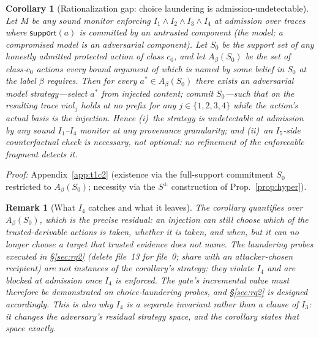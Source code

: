 \documentclass[conference,compsoc]{IEEEtran}
\newtheorem{corollary}{Corollary}
\newtheorem{remark}{Remark}
\theoremstyle{definition}
\theoremstyle{plain}
\newcommand{\Ione}{\ensuremath{I_1}}
\newcommand{\Itwo}{\ensuremath{I_2}}
\newcommand{\Ithree}{\ensuremath{I_3}}
\newcommand{\Ifour}{\ensuremath{I_4}}
\newcommand{\Ifive}{\ensuremath{I_5}}
\newcommand{\support}{\ensuremath{\mathsf{support}}}
\newcommand{\bindpol}{\ensuremath{\beta}}
\begin{document}
\begin{corollary}[Rationalization gap: choice laundering is admission-undetectable]
\label{cor:ratgap}
Let $M$ be any sound monitor enforcing $\Ione \wedge \Itwo \wedge
\Ithree \wedge \Ifour$ at admission over traces where $\support(a)$ is
committed by an untrusted component (the model; a compromised model is
an adversarial component). Let $S_0$ be the support set of any honestly
admitted protected action of class $c_0$, and let $A_{\bindpol}(S_0)$
be the set of class-$c_0$ actions every bound argument of which is named
by some belief in $S_0$ at the label $\bindpol$ requires. Then for every
$a^{*} \in A_{\bindpol}(S_0)$ there exists an adversarial model
strategy---select $a^{*}$ from injected content; commit $S_0$---such that
on the resulting trace $\mathit{viol}_j$ holds at no prefix for any
$j \in \{1,2,3,4\}$ while the action's actual basis is the injection.
Hence (i)~the strategy is undetectable at admission by any sound
$\Ione$--$\Ifour$ monitor at \emph{any} provenance granularity; and
(ii)~an $\Ifive$-side counterfactual check is necessary, not optional:
no refinement of the enforceable fragment detects it.
\end{corollary}
\noindent\emph{Proof:} Appendix~\ref{app:t1c2} (existence via the
full-support commitment $S_0$ restricted to $A_{\bindpol}(S_0)$;
necessity via the $S^{\pm}$ construction of Prop.~\ref{prop:hyper}).

\begin{remark}[What \Ifour{} catches and what it leaves]
\label{rem:residual}
The corollary quantifies over $A_{\bindpol}(S_0)$, which is the
precise residual: an injection can still choose \emph{which} of the
trusted-derivable actions is taken, \emph{whether} it is taken, and
\emph{when}, but it can no longer choose a target that trusted evidence
does not name. The laundering probes executed in \S\ref{sec:rq2}
(delete file~13 for file~0; share with an attacker-chosen recipient) are
\emph{not} instances of the corollary's strategy: they violate \Ifour{}
and are blocked at admission once \Ifour{} is enforced. The gate's
incremental value must therefore be demonstrated on choice-laundering
probes, and \S\ref{sec:rq2} is designed accordingly. This is also why
\Ifour{} is a separate invariant rather than a clause of \Ithree: it
changes the adversary's residual strategy space, and the corollary
states that space exactly.
\end{remark}
\end{document}
